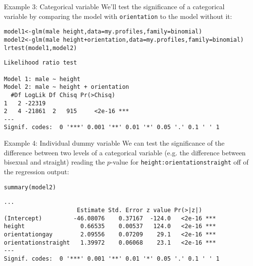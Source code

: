 \documentclass{beamer}\usepackage[]{graphicx}\usepackage[]{color}
\makeatletter
\newcommand{\hlopt}[1]{\textcolor[rgb]{1,0.894,0.769}{#1}}%
\newcommand{\hlstd}[1]{\textcolor[rgb]{1,0.894,0.769}{#1}}%
\newcommand{\hlkwb}[1]{\textcolor[rgb]{0.804,0.776,0.451}{#1}}%
\newcommand{\hlkwc}[1]{\textcolor[rgb]{0.78,0.941,0.545}{#1}}%
\newcommand{\hlkwd}[1]{\textcolor[rgb]{1,0.78,0.769}{#1}}%
\newenvironment{kframe}{%
 \def\at@end@of@kframe{}%
 \ifinner\ifhmode%
  \def\at@end@of@kframe{\end{minipage}}%
  \begin{minipage}{\columnwidth}%
 \fi\fi%
 \def\FrameCommand##1{\hskip\@totalleftmargin \hskip-\fboxsep
 \colorbox{shadecolor}{##1}\hskip-\fboxsep
     \hskip-\linewidth \hskip-\@totalleftmargin \hskip\columnwidth}%
 \MakeFramed {\advance\hsize-\width
   \@totalleftmargin\z@ \linewidth\hsize
   \@setminipage}}%
 {\par\unskip\endMakeFramed%
 \at@end@of@kframe}
\newenvironment{knitrout}{}{} %
\makeatother
\begin{document}
\begin{darkframes}
    \begin{frame}[fragile]{Example 3: Categorical variable}
      We'll test the significance of a categorical variable by comparing the model with \texttt{orientation} to the model without it:
      \fontvsm
\begin{knitrout}
\begin{kframe}
\begin{alltt}
\hlstd{model1} \hlkwb{<-} \hlkwd{glm}\hlstd{(male} \hlopt{~} \hlstd{height,} \hlkwc{data}\hlstd{=my.profiles,} \hlkwc{family}\hlstd{=binomial)}
\hlstd{model2} \hlkwb{<-} \hlkwd{glm}\hlstd{(male} \hlopt{~} \hlstd{height} \hlopt{+} \hlstd{orientation,} \hlkwc{data}\hlstd{=my.profiles,} \hlkwc{family}\hlstd{=binomial)}
\hlkwd{lrtest}\hlstd{(model1, model2)}
\end{alltt}
\begin{verbatim}
Likelihood ratio test

Model 1: male ~ height
Model 2: male ~ height + orientation
  #Df LogLik Df Chisq Pr(>Chisq)    
1   2 -22319                        
2   4 -21861  2   915     <2e-16 ***
---
Signif. codes:  0 '***' 0.001 '**' 0.01 '*' 0.05 '.' 0.1 ' ' 1
\end{verbatim}
\end{kframe}
\end{knitrout}
    \end{frame}

    \begin{frame}[fragile]{Example 4: Individual dummy variable}
      We can test the significance of the difference between two levels of a categorical variable (e.g. the difference between bisexual and straight) reading the $p$-value for \texttt{height:orientationstraight} off of the regression output:

      \fontvsm
\begin{knitrout}
\begin{kframe}
\begin{alltt}
\hlkwd{summary}\hlstd{(model2)}
\end{alltt}
\begin{verbatim}
...
                     Estimate Std. Error z value Pr(>|z|)    
(Intercept)         -46.08076    0.37167  -124.0   <2e-16 ***
height                0.66535    0.00537   124.0   <2e-16 ***
orientationgay        2.09556    0.07209    29.1   <2e-16 ***
orientationstraight   1.39972    0.06068    23.1   <2e-16 ***
---
Signif. codes:  0 '***' 0.001 '**' 0.01 '*' 0.05 '.' 0.1 ' ' 1


\end{verbatim}
\end{kframe}
\end{knitrout}
\end{frame}
\end{darkframes}
\end{document}
